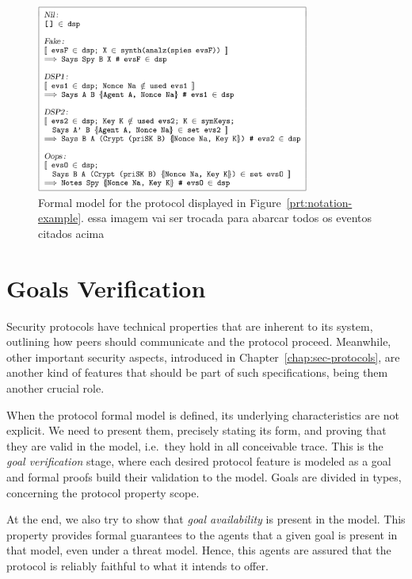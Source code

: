 \begin{figure}\label{fig:notation-example-model}
  \centering
  \includegraphics[width=0.8\textwidth]{img/prt-example-model}
  \caption{Formal model for the protocol displayed in Figure~\ref{prt:notation-example}. {\color{blue} essa imagem vai ser trocada para abarcar todos os eventos citados acima}}
\end{figure}





\section{Goals Verification}
Security protocols have technical properties that are inherent to its system, outlining how peers should communicate and the protocol proceed. Meanwhile, other important security aspects, introduced in Chapter~\ref{chap:sec-protocols}, are another kind of features that should be part of such specifications, being them another crucial role.

When the protocol formal model is defined, its underlying characteristics are not explicit. We need to present them, precisely stating its form, and proving that they are valid in the model, i.e.\ they hold in all conceivable trace. This is the \textit{goal verification} stage, where each desired protocol feature is modeled as a goal and formal proofs build their validation to the model. Goals are divided in types, concerning the protocol property scope.

At the end, we also try to show that \textit{goal availability} is present in the model. This property provides formal guarantees to the agents that a given goal is present in that model, even under a threat model. Hence, this agents are assured that the protocol is reliably faithful to what it intends to offer.




